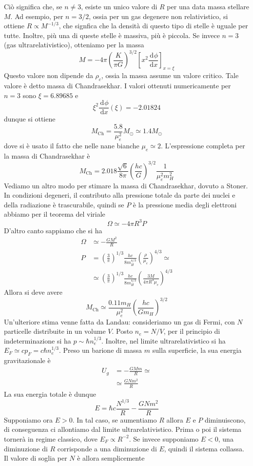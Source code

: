 \documentclass[a4paper,11pt]{article}
\renewcommand{\d}{\mathrm{d}} %
\newcommand{\der}[3][]{\frac{\d ^{#1}#2}{\d {#3}^{#1}}} %
\newcommand{\s}{_\odot}
\renewcommand{\d}{\,\mathrm{d}}
\theoremstyle{theorem}
\theoremstyle{definition}
\begin{document}
\begin{itemize}
		Ciò significa che, se $n\neq 3$, esiste un unico valore di $R$ per una data massa stellare $M$. Ad esempio, per $n=3/2$, ossia per un gas degenere non relativistico, si ottiene $R\propto M^{-1/3}$, che signfica che la densità di questo tipo di stelle è uguale per tutte. Inoltre, più una di queste stelle è massiva, più è piccola. Se invece $n=3$ (gas ultrarelativistico), otteniamo per la massa
		\[M=-4\pi\left(\frac{K}{\pi G}\right)^{3/2}\left[x^2\der{\phi}{x}\right]_{x=\xi}\]
		Questo valore non dipende da $\rho_c$, ossia la massa assume un valore critico. Tale valore è detto massa di Chandrasekhar. I valori ottenuti numericamente per $n=3$ sono $\xi=6.89685$ e
		\[\xi^2\der{\phi}{x}(\xi)=-2.01824\]
		dunque si ottiene
		\[M_\textrm{Ch}=\frac{5.8}{\mu_e^2}M\s\simeq1.4 M\s\]
		dove si è usato il fatto che nelle nane bianche $\mu_e\simeq 2$. L'espressione completa per la massa di Chandrasekhar è
		\[M_\textrm{Ch}=2.018\frac{\sqrt{6}}{8\pi}\left(\frac{hc}{G}\right)^{3/2}\frac{1}{\mu_e^2m_H^2}\]
		Vediamo un altro modo per stimare la massa di Chandrasekhar, dovuto a Stoner. In condizioni degeneri, il contributo alla pressione totale da parte dei nuclei e della radiazione è trascurabile, quindi se $P$ è la pressione media degli elettroni abbiamo per il teorema del viriale
		\[\Omega\simeq-4\pi R^3 P\]
		D'altro canto sappiamo che si ha
		\begin{align*}
			\Omega&\simeq-\frac{GM^2}{R}\\
			P&=\left(\frac{3}{\pi}\right)^{1/3}\frac{hc}{8m_H^{4/3}}\left(\frac{\rho}{\mu_e}\right)^{4/3}\simeq\\&\simeq \left(\frac{3}{\pi}\right)^{1/3}\frac{hc}{8m_H^{4/3}}\left(\frac{3M}{4\pi R^3\mu_e}\right)^{4/3}
		\end{align*}
		Allora si deve avere
		\[M_\textrm{Ch}\simeq\frac{0.11m_H}{\mu_e^2}\left(\frac{hc}{Gm_H}\right)^{3/2}\]
		Un'ulteriore stima venne fatta da Landau: consideriamo un gas di Fermi, con $N$ particelle distribuite in un volume $V$. Posto $n_e=N/V$, per il principio di indeterminazione si ha $p\sim \hbar n_e^{1/3}$. Inoltre, nel limite ultrarelativistico si ha $E_F\simeq cp_F=c\hbar n_e^{1/3}$. Preso un barione di massa $m$ sulla superficie, la sua energia gravitazionale è
		\begin{align*}
			U_g&=-\frac{GMm}{R}\simeq\\&\simeq\frac{GNm^2}{R}
		\end{align*}
		La sua energia totale è dunque
		\[E=\hbar c\frac{N^{1/3}}{R}-\frac{GNm^2}{R}\]
		Supponiamo ora $E>0$. In tal caso, se aumentiamo $R$ allora $E$ e $P$ diminuiscono, di conseguenza ci allontiamo dal limite ultrarelativistico. Prima o poi il sistema tornerà in regime classico, dove $E_F\propto R^{-2}$. Se invece supponiamo $E<0$, una diminuzione di $R$ corrisponde a una diminuzione di $E$, quindi il sistema collassa. Il valore di soglia per $N$ è allora semplicemente

\end{itemize}
\end{document}

